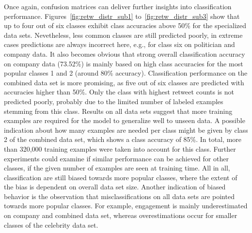 Once again, confusion matrices can deliver further insights into classification
performance.
Figures~\ref{fig:retw_distr_sub1} to~\ref{fig:retw_distr_sub3} show that up to
four out of six classes exhibit class accuracies above 50\% for the specialized
data sets.
Nevetheless, less common classes are still predicted poorly, in extreme cases
predictions are always incorrect here, e.g., for class six on politician and
company data.
It also becomes obvious that strong overall classification accuracy on company data
(73.52\%) is mainly based on high class accuracies for the most popular classes
1 and 2 (around 80\% accuracy).
Classification performance on the combined data set is more promising, as five
out of six classes are predicted with accuracies higher than 50\%.
Only the class with highest retweet counts is not predicted poorly, probably due
to the limited number of labeled examples stemming from this class.
Results on all data sets suggest that more training examples are
required for the model to generalize well to unseen data.
A possible indication about how many examples are needed per class might be
given by class 2 of the combined data set, which shows a class accuracy of 85\%.
In total, more than 320,000 training examples were taken into account for this
class.
Further experiments could examine if similar performance can be achieved for
other classes, if the given number of examples are seen at training time.
All in all, classification are still biased towards more popular classes, where
the extent of the bias is dependent on overall data set size.
Another indication of biased behavior is the observation that misclassifications
on all data sets are pointed towards more popular classes.
For example, engagement is mainly underestimated on company and combined data set,
whereas overestimations occur for smaller classes of the celebrity data set.


